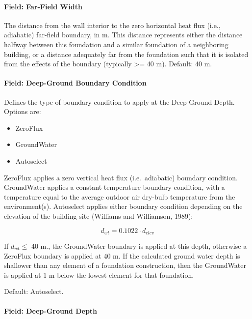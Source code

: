 \paragraph{Field: Far-Field Width}\label{foundation-kiva-settings-far-field-width}

The distance from the wall interior to the zero horizontal heat flux
(i.e., adiabatic) far-field boundary, in m. This distance represents
either the distance halfway between this foundation and a similar
foundation of a neighboring building, or a distance adequately far from
the foundation such that it is isolated from the effects of the boundary
(typically \textgreater{}= 40 m). Default: 40 m.

\paragraph{Field: Deep-Ground Boundary Condition}\label{foundation-kiva-settings-deep-ground-boundary-condition}

Defines the type of boundary condition to apply at the Deep-Ground
Depth. Options are:

\begin{itemize}
\tightlist
\item
  ZeroFlux
\item
  GroundWater
\item
  Autoselect
\end{itemize}

ZeroFlux applies a zero vertical heat flux (i.e.~adiabatic) boundary
condition. GroundWater applies a constant temperature boundary
condition, with a temperature equal to the average outdoor air dry-bulb
temperature from the environment(s). Autoselect applies either boundary
condition depending on the elevation of the building site (Williams and
Williamson, 1989):

\[d_{wt}=0.1022\cdot d_{elev}\]

If \(d_{wt} \le\) 40 m., the GroundWater boundary is applied at this depth, otherwise
a ZeroFlux boundary is applied at 40 m. If the calculated ground water depth is
shallower than any element of a foundation construction, then the GroundWater
is applied at 1 m below the lowest element for that foundation.

Default: Autoselect.

\paragraph{Field: Deep-Ground Depth}\label{foundation-kiva-settings-deep-ground-depth}

